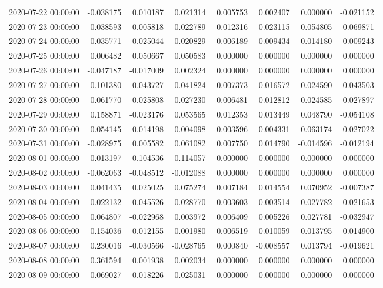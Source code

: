 \begin{tabular}{lrrrrrrr}
2020-07-22 00:00:00 & -0.038175 & 0.010187 & 0.021314 & 0.005753 & 0.002407 & 0.000000 & -0.021152 \\
2020-07-23 00:00:00 & 0.038593 & 0.005818 & 0.022789 & -0.012316 & -0.023115 & -0.054805 & 0.069871 \\
2020-07-24 00:00:00 & -0.035771 & -0.025044 & -0.020829 & -0.006189 & -0.009434 & -0.014180 & -0.009243 \\
2020-07-25 00:00:00 & 0.006482 & 0.050667 & 0.050583 & 0.000000 & 0.000000 & 0.000000 & 0.000000 \\
2020-07-26 00:00:00 & -0.047187 & -0.017009 & 0.002324 & 0.000000 & 0.000000 & 0.000000 & 0.000000 \\
2020-07-27 00:00:00 & -0.101380 & -0.043727 & 0.041824 & 0.007373 & 0.016572 & -0.024590 & -0.043503 \\
2020-07-28 00:00:00 & 0.061770 & 0.025808 & 0.027230 & -0.006481 & -0.012812 & 0.024585 & 0.027897 \\
2020-07-29 00:00:00 & 0.158871 & -0.023176 & 0.053565 & 0.012353 & 0.013449 & 0.048790 & -0.054108 \\
2020-07-30 00:00:00 & -0.054145 & 0.014198 & 0.004098 & -0.003596 & 0.004331 & -0.063174 & 0.027022 \\
2020-07-31 00:00:00 & -0.028975 & 0.005582 & 0.061082 & 0.007750 & 0.014790 & -0.014596 & -0.012194 \\
2020-08-01 00:00:00 & 0.013197 & 0.104536 & 0.114057 & 0.000000 & 0.000000 & 0.000000 & 0.000000 \\
2020-08-02 00:00:00 & -0.062063 & -0.048512 & -0.012088 & 0.000000 & 0.000000 & 0.000000 & 0.000000 \\
2020-08-03 00:00:00 & 0.041435 & 0.025025 & 0.075274 & 0.007184 & 0.014554 & 0.070952 & -0.007387 \\
2020-08-04 00:00:00 & 0.022132 & 0.045526 & -0.028770 & 0.003603 & 0.003514 & -0.027782 & -0.021653 \\
2020-08-05 00:00:00 & 0.064807 & -0.022968 & 0.003972 & 0.006409 & 0.005226 & 0.027781 & -0.032947 \\
2020-08-06 00:00:00 & 0.154036 & -0.012155 & 0.001980 & 0.006519 & 0.010059 & -0.013795 & -0.014900 \\
2020-08-07 00:00:00 & 0.230016 & -0.030566 & -0.028765 & 0.000840 & -0.008557 & 0.013794 & -0.019621 \\
2020-08-08 00:00:00 & 0.361594 & 0.001938 & 0.002034 & 0.000000 & 0.000000 & 0.000000 & 0.000000 \\
2020-08-09 00:00:00 & -0.069027 & 0.018226 & -0.025031 & 0.000000 & 0.000000 & 0.000000 & 0.000000 \\

\end{tabular}
